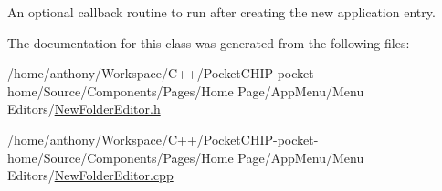 An optional callback routine to run after creating the new application entry. 

The documentation for this class was generated from the following files\+:\begin{DoxyCompactItemize}
\item 
/home/anthony/\+Workspace/\+C++/\+Pocket\+C\+H\+I\+P-\/pocket-\/home/\+Source/\+Components/\+Pages/\+Home Page/\+App\+Menu/\+Menu Editors/\mbox{\hyperlink{NewFolderEditor_8h}{New\+Folder\+Editor.\+h}}\item 
/home/anthony/\+Workspace/\+C++/\+Pocket\+C\+H\+I\+P-\/pocket-\/home/\+Source/\+Components/\+Pages/\+Home Page/\+App\+Menu/\+Menu Editors/\mbox{\hyperlink{NewFolderEditor_8cpp}{New\+Folder\+Editor.\+cpp}}\end{DoxyCompactItemize}
